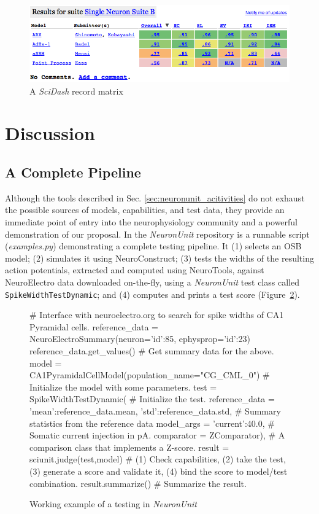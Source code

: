 \documentclass[11pt,letterpaper]{article}
\let\verbx\lstinline
\begin{document}
\begin{figure}%
\includegraphics[scale=0.65]{table.png}
\caption{A \textit{SciDash} record matrix}
\label{fig:scidash_matrix}
\vspace{-15px}
\end{figure}
\vspace{-10px}
\leavevmode

\section{Discussion}

\subsection{A Complete Pipeline}
Although the tools described in Sec. \ref{sec:neuronunit_acitivities} do not exhaust the possible sources of models, capabilities, and test data, they provide an immediate point of entry into the neurophysiology community and a powerful demonstration of our proposal. 
In the \textit{NeuronUnit} repository\cite{neurounit_url} is a runnable script (\textit{examples.py}) demonstrating a complete testing pipeline. 
It (1) selects an OSB model; 
(2) simulates it using NeuroConstruct; 
(3) tests the widths of the resulting action potentials, extracted and computed using NeuroTools, against NeuroElectro data downloaded on-the-fly, using a \textit{NeuronUnit} test class called \verbx{SpikeWidthTestDynamic}; 
and (4) computes and prints a test score (Figure~\ref{fig:neuronunit_example}).

\begin{figure}
\begin{python}
# Interface with neuroelectro.org to search for spike widths of CA1 Pyramidal cells. 
reference_data = NeuroElectroSummary(neuron={'id':85}, ephysprop={'id':23})
reference_data.get_values()  # Get summary data for the above. 
model = CA1PyramidalCellModel(population_name="CG_CML_0") # Initialize the model with some parameters.
test = SpikeWidthTestDynamic( # Initialize the test.    
	reference_data = {'mean':reference_data.mean, 'std':reference_data.std}, # Summary statistics from the reference data
	model_args = {'current':40.0}, # Somatic current injection in pA.  
	comparator = ZComparator), # A comparison class that implements a Z-score.  
result = sciunit.judge(test,model) # (1) Check capabilities, (2) take the test, (3) generate a score and validate it, (4) bind the score to model/test combination. 
result.summarize() # Summarize the result.  
\end{python}
\caption{Working example of a testing in \textit{NeuronUnit}}
\label{fig:neuronunit_example}
\vspace{-15px}
\end{figure}
\end{document}
